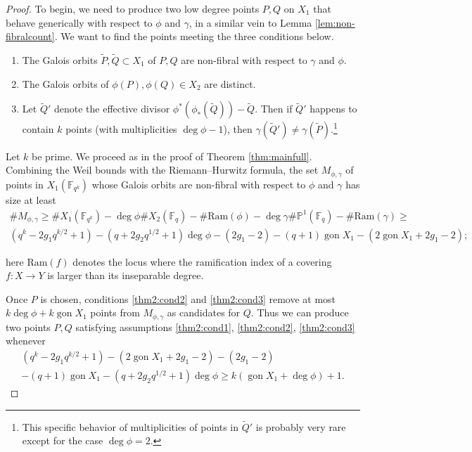 \documentclass[11pt]{amsart}
\newcommand{\F}{\mathbb{F}}
\newcommand{\PP}{\mathbb{P}}
\newcommand{\gon}{\operatorname{gon}}
\theoremstyle{definition}
\theoremstyle{remark}
\begin{document}
\begin{proof}
To begin, we need to produce two low degree points $P,Q$ on $X_1$ that behave generically with respect to $\phi$ and $\gamma$, in a similar vein to Lemma \ref{lem:non-fibralcount}. We want to find the points meeting the three conditions below. %
    \begin{enumerate}[label={(\alph*)}]
    \item The Galois orbits $\tilde{P}, \tilde{Q} \subset X_1$ of $P,Q$ are non-fibral with respect to $\gamma$ and $\phi$.\label{thm2:cond1}
    \vspace{1mm}
    \item The Galois orbits of $\phi(P), \phi(Q) \in X_2$ are distinct.  \label{thm2:cond2}
    \vspace{1mm}
    \item Let $\tilde{Q}'$ denote the effective divisor $\phi^*(\phi_*(\tilde{Q}))-\tilde{Q}$. Then if $\tilde{Q}'$ happens to contain $k$ points (with multiplicities $\deg \phi -1$), then $\gamma(\tilde{Q}') \neq \gamma(\tilde{P})$.\footnote{This specific behavior of multiplicities of points in $\tilde{Q}'$ is probably very rare except for the case $\deg \phi =2 $.} \label{thm2:cond3}
    \end{enumerate}
Let $k$ be prime. We proceed as in the proof of Theorem \ref{thm:mainfull}. Combining the Weil bounds with the Riemann--Hurwitz formula, the set $M_{\phi, \gamma}$ of points in $X_1(\F_{q^k})$ whose Galois orbits are non-fibral with respect to $\phi$ and $\gamma$ has size at least
\begin{multline*}
    \#M_{\phi, \gamma} \geqslant\#X_1(\F_{q^k}) - \deg \phi\#X_2(\F_q) - \#\mathrm{Ram} (\phi) - \deg \gamma\#\PP^1(\F_q) - \#\mathrm{Ram}(\gamma) 
    \geqslant \\
 (q^k - 2g_1q^{k/2}  + 1)  - (q+ 2g_2 q^{1/2} + 1) \deg \phi  - (2g_1 - 2)  - (q+ 1) \gon X_1 -(2\gon X_1 +2g_1 - 2);
\end{multline*}

here $\mathrm{Ram}(f)$ denotes the locus where the ramification index of a covering $f:X \to Y$ is larger than its inseparable degree.

Once $P$ is chosen, conditions \ref{thm2:cond2} and \ref{thm2:cond3} remove at most $k \deg \phi + k \gon X_1$ points from $M_{\phi, \gamma}$ as candidates for $Q$. Thus we can produce two points $P,Q$ satisfying assumptions \ref{thm2:cond1}, \ref{thm2:cond2}, \ref{thm2:cond3} whenever
 \begin{multline*} (q^k - 2g_1q^{k/2}  + 1) - (2\gon X_1 +2g_1 - 2) - (2g_1 - 2)  \\ - (q+ 1) \gon X_1 - (q+ 2g_2 q^{1/2} + 1) \deg \phi \geqslant k(\gon X_1 + \deg \phi) + 1.
 \end{multline*}


\end{proof}
\end{document}

